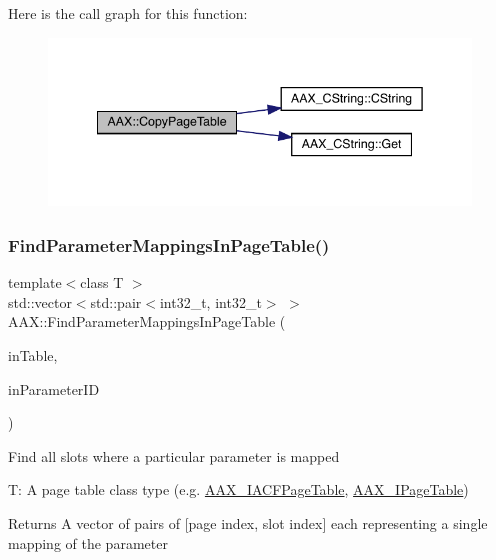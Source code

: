 Here is the call graph for this function\+:
\nopagebreak
\begin{figure}[H]
\begin{center}
\leavevmode
\includegraphics[width=342pt]{a00852_a99fe28eb20cfcef49e99710060c5ebe0_cgraph}
\end{center}
\end{figure}
\mbox{\label{a00852_ac87bacdbc6323ab3f099c16ed8b508be}} 
\subsubsection{\texorpdfstring{FindParameterMappingsInPageTable()}{FindParameterMappingsInPageTable()}}
{\footnotesize\ttfamily template$<$class T $>$ \\
std\+::vector$<$std\+::pair$<$int32\+\_\+t, int32\+\_\+t$>$ $>$ A\+A\+X\+::\+Find\+Parameter\+Mappings\+In\+Page\+Table (\begin{DoxyParamCaption}\item[{const T \&}]{in\+Table,  }\item[{\mbox{\hyperlink{a00392_a1440c756fe5cb158b78193b2fc1780d1}{A\+A\+X\+\_\+\+C\+Param\+ID}}}]{in\+Parameter\+ID }\end{DoxyParamCaption})\hspace{0.3cm}{\ttfamily [inline]}}

Find all slots where a particular parameter is mapped

{\ttfamily T\+:} A page table class type (e.\+g. \mbox{\hyperlink{a01725}{A\+A\+X\+\_\+\+I\+A\+C\+F\+Page\+Table}}, \mbox{\hyperlink{a01849}{A\+A\+X\+\_\+\+I\+Page\+Table}})

\begin{DoxyReturn}{Returns}
A vector of pairs of \mbox{[}page index, slot index\mbox{]} each representing a single mapping of the parameter 
\end{DoxyReturn}


